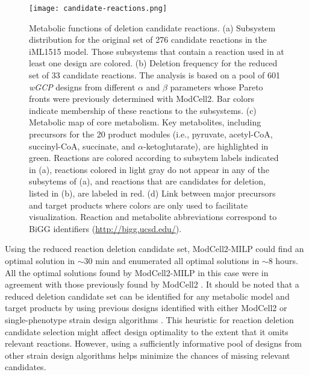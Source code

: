 \begin{figure}[p]
    \centering
    \texttt{[image: candidate-reactions.png]}
    \caption[Metabolic functions of deletion candidate reactions]{Metabolic functions of deletion candidate reactions. (a) Subsystem distribution for the original set of 276 candidate reactions in the iML1515 model. Those subsystems that contain a reaction used in at least one design are colored.  (b) Deletion frequency for the reduced set of 33 candidate reactions. The analysis is based on a pool of 601 \textit{wGCP} designs from different $\alpha$ and $\beta$ parameters whose Pareto fronts were previously determined with ModCell2.\citep{garcia2019} Bar colors indicate membership of these reactions to the subsystems. (c) Metabolic map of core metabolism. Key metabolites, including precursors for the 20 product modules (i.e., pyruvate, acetyl-CoA, succinyl-CoA, succinate, and $\alpha$-ketoglutarate), are highlighted in green. Reactions are colored according to subsytem labels indicated in (a), reactions colored in light gray do not appear  in any of the subsytems of (a), and reactions that are candidates for deletion, listed in (b), are labeled in red. (d) Link between major precursors and target products where colors are only used to facilitate visualization. Reaction and metabolite abbreviations correspond to BiGG\citep{king2015} identifiers (\protect\url{http://bigg.ucsd.edu/}).
    }
    \label{fig5:candidate-reactions}
\end{figure}

Using the reduced reaction deletion candidate set, ModCell2-MILP could find an optimal solution in $\sim 30$ min and enumerated all optimal solutions in $\sim 8$ hours. All the optimal solutions found by ModCell2-MILP in this case were in agreement with those previously found by ModCell2 \citep{garcia2019}. It should be noted that a reduced deletion candidate set can be identified for any metabolic model and target products by using previous designs identified with either ModCell2 or single-phenotype strain design algorithms \citep{long2015}. This heuristic for reaction deletion candidate selection might affect design optimality to the extent that it omits relevant reactions. However, using a sufficiently informative pool of designs from other strain design algorithms helps minimize the chances of missing relevant candidates.


